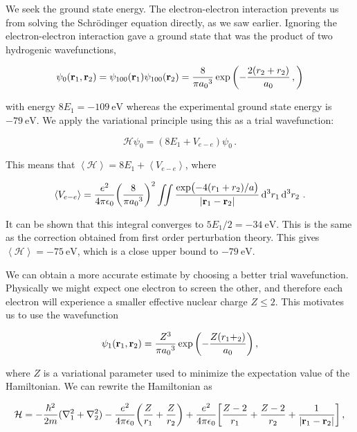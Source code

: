 \documentclass[12pt, titlepage]{article}
\newcommand{\exv}[1]{\left\langle #1 \right\rangle}
\begin{document}

We seek the ground state energy. The electron-electron interaction prevents us from solving the Schrödinger equation directly, as we saw earlier. Ignoring the electron-electron interaction gave a ground state that was the product of two hydrogenic wavefunctions,

\begin{equation*}
	\psi_0(\vb{r}_1,\vb{r}_2) = \psi_{100}(\vb{r}_1)\psi_{100}(\vb{r}_2) = \frac{8}{\pi{a_0}^3}\exp\qty(-\frac{2(r_2 + r_2)}{a_0} \,,)
\end{equation*}

with energy $8E_1 = -\SI{109}{\eV}$ whereas the experimental ground state energy is $-\SI{79}{\eV}$. We apply the variational principle using this as a trial wavefunction:

\begin{equation}
	\mathcal{H}\psi_0 = (8E_1 + V_{e-e})\psi_0 \,.
\end{equation}

This means that $\exv{\mathcal{H}} = 8E_1 + \exv{V_{e-e}}$, where

\begin{equation}
	\exv{V_{e-e}} = \frac{e^2}{4\pi\epsilon_0}\qty(\frac{8}{\pi {a_0}^3})^2\iint\frac{\exp\bigl(-4(r_1+r_2)/a\bigr)}{|\vb{r}_1 - \vb{r}_2|}\dd[3]{r_1}\dd[3]{r_2} \,.
\end{equation}

It can be shown that this integral converges to $5E_1/2 = -\SI{34}{\eV}$. This is the same as the correction obtained from first order perturbation theory.  This gives $\exv{\mathcal{H}} = -\SI{75}{\eV}$, which is a close upper bound to $-\SI{79}{\eV}$.

We can obtain a more accurate estimate by choosing a better trial wavefunction. Physically we might expect one electron to screen the other, and therefore each electron will experience a smaller effective nuclear charge $Z \leq 2$. This motivates us to use the wavefunction

\begin{equation}
	\psi_1(\vb{r}_1,\vb{r}_2) = \frac{Z^3}{\pi{a_0}^3}\exp\qty(-\frac{Z(r_1 + _2)}{a_0}) \,,
\end{equation}

where $Z$ is a variational parameter used to minimize the expectation value of the Hamiltonian. We can rewrite the Hamiltonian as

\begin{equation}
	\mathcal{H} = -\frac{\hbar^2}{2m}(\laplacian{}_1 + \laplacian{}_2) - \frac{e^2}{4\pi\epsilon_0}\qty(\frac{Z}{r_1} + \frac{Z}{r_2}) + \frac{e^2}{4\pi\epsilon_0}\qty[\frac{Z-2}{r_1} + \frac{Z-2}{r_2} + \frac{1}{|\vb{r}_1 - \vb{r}_2|}] \,,
\end{equation}
\end{document}
